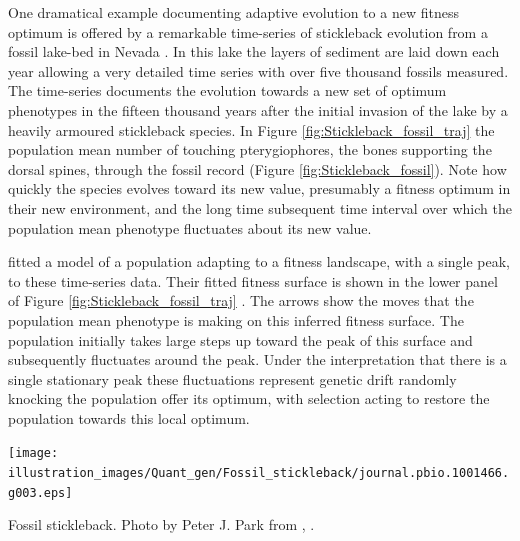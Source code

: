 One dramatical example documenting adaptive evolution to a new
fitness optimum is offered by a remarkable time-series of
stickleback evolution from a fossil lake-bed in Nevada \citep{bell2006inferring}. In this lake
the layers of sediment are laid down each year allowing a very detailed
time series with over five thousand fossils measured. The time-series
documents the evolution towards a new set of optimum phenotypes in the
fifteen thousand years after the initial invasion of the lake by a
heavily armoured stickleback species. In Figure \ref{fig:Stickleback_fossil_traj} the population mean number of
touching pterygiophores, the bones supporting the dorsal spines,
through the fossil record (Figure \ref{fig:Stickleback_fossil}). Note how quickly the species evolves toward
its new value, presumably a fitness optimum in their new environment, and the long time subsequent time interval over which
the population mean phenotype fluctuates about its new value.


\citet{hunt2008evolution} fitted a model of a population adapting to a
fitness landscape, with a single peak, to these time-series data. Their fitted fitness
surface is shown in the lower panel of Figure \ref{fig:Stickleback_fossil_traj} . The arrows show the moves that the
population mean phenotype is making on this inferred fitness
surface. The population initially takes large steps up toward the peak
of this surface and subsequently fluctuates around the peak. Under the
interpretation that there is a single stationary peak these
fluctuations represent genetic drift randomly knocking the population
offer its optimum, with selection acting to restore
the population towards this local optimum. \begin{marginfigure}
 \begin{center}
 \texttt{[image: illustration\_images/Quant\_gen/Fossil\_stickleback/journal.pbio.1001466.g003.eps]}
 \end{center}
 \caption{Fossil stickleback. Photo by Peter J. Park from \citet{losos2013evolutionary}, \PLOSccBY.} \label{fig:Stickleback_fossil}  
\end{marginfigure}

